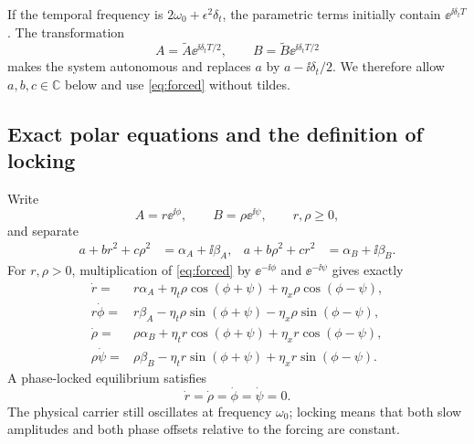If the temporal frequency is
$2\omega_0+\epsilon^2\delta_t$, the parametric terms initially contain
$\ee^{\ii\delta_tT}$. The transformation
\begin{equation}
 A=\widetilde A\ee^{\ii\delta_tT/2},\qquad
 B=\widetilde B\ee^{\ii\delta_tT/2}
 \label{eq:pure21-detuning-transform}
\end{equation}
makes the system autonomous and replaces $a$ by
$a-\ii\delta_t/2$. We therefore allow $a,b,c\in\mathbb C$ below and use
\eqref{eq:forced} without tildes.

\subsection{Exact polar equations and the definition of locking}

Write
\begin{equation}
 A=r\ee^{\ii\phi},\qquad B=\rho\ee^{\ii\psi},
 \qquad r,\rho\geq0,
 \label{eq:general-polar-form}
\end{equation}
and separate
\begin{align}
 a+br^2+c\rho^2&=\alpha_A+\ii\beta_A,&
 a+b\rho^2+cr^2&=\alpha_B+\ii\beta_B.
 \label{eq:polar-local-coefficients}
\end{align}
For $r,\rho>0$, multiplication of \eqref{eq:forced} by
$\ee^{-\ii\phi}$ and $\ee^{-\ii\psi}$ gives exactly
\begin{align}
 \dot r={}&r\alpha_A+\eta_t\rho\cos(\phi+\psi)
 +\eta_x\rho\cos(\phi-\psi),
 \label{eq:polar-r}\\
 r\dot\phi={}&r\beta_A-\eta_t\rho\sin(\phi+\psi)
 -\eta_x\rho\sin(\phi-\psi),
 \label{eq:polar-phi}\\
 \dot\rho={}&\rho\alpha_B+\eta_t r\cos(\phi+\psi)
 +\eta_xr\cos(\phi-\psi),
 \label{eq:polar-rho}\\
 \rho\dot\psi={}&\rho\beta_B-\eta_t r\sin(\phi+\psi)
 +\eta_xr\sin(\phi-\psi).
 \label{eq:polar-psi}
\end{align}
A phase-locked equilibrium satisfies
\begin{equation}
 \dot r=\dot\rho=\dot\phi=\dot\psi=0.
 \label{eq:general-locking-definition}
\end{equation}
The physical carrier still oscillates at frequency $\omega_0$; locking means
that both slow amplitudes and both phase offsets relative to the forcing are
constant.

